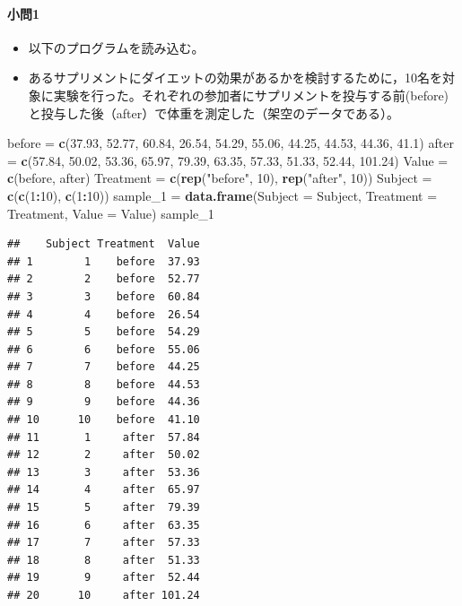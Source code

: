\documentclass[]{article}
\newenvironment{Shaded}{\begin{snugshade}}{\end{snugshade}}
\newcommand{\KeywordTok}[1]{\textcolor[rgb]{0.13,0.29,0.53}{\textbf{#1}}}
\newcommand{\DataTypeTok}[1]{\textcolor[rgb]{0.13,0.29,0.53}{#1}}
\newcommand{\DecValTok}[1]{\textcolor[rgb]{0.00,0.00,0.81}{#1}}
\newcommand{\FloatTok}[1]{\textcolor[rgb]{0.00,0.00,0.81}{#1}}
\newcommand{\StringTok}[1]{\textcolor[rgb]{0.31,0.60,0.02}{#1}}
\newcommand{\OperatorTok}[1]{\textcolor[rgb]{0.81,0.36,0.00}{\textbf{#1}}}
\newcommand{\NormalTok}[1]{#1}
\providecommand{\tightlist}{%
  \setlength{\itemsep}{0pt}\setlength{\parskip}{0pt}}
\let\oldparagraph\paragraph
\renewcommand{\paragraph}[1]{\oldparagraph{#1}\mbox{}}
\begin{document}
\paragraph{小問1}\label{1}

\begin{itemize}
\tightlist
\item
  以下のプログラムを読み込む。\\
\item
  あるサプリメントにダイエットの効果があるかを検討するために，10名を対象に実験を行った。それぞれの参加者にサプリメントを投与する前(before)と投与した後（after）で体重を測定した（架空のデータである）。
\end{itemize}

\begin{Shaded}
\begin{Highlighting}[]
\NormalTok{before =}\StringTok{ }\KeywordTok{c}\NormalTok{(}\FloatTok{37.93}\NormalTok{, }\FloatTok{52.77}\NormalTok{, }\FloatTok{60.84}\NormalTok{, }\FloatTok{26.54}\NormalTok{, }\FloatTok{54.29}\NormalTok{, }\FloatTok{55.06}\NormalTok{, }\FloatTok{44.25}\NormalTok{, }\FloatTok{44.53}\NormalTok{, }\FloatTok{44.36}\NormalTok{, }\FloatTok{41.1}\NormalTok{)}
\NormalTok{after =}\StringTok{ }\KeywordTok{c}\NormalTok{(}\FloatTok{57.84}\NormalTok{, }\FloatTok{50.02}\NormalTok{, }\FloatTok{53.36}\NormalTok{, }\FloatTok{65.97}\NormalTok{, }\FloatTok{79.39}\NormalTok{, }\FloatTok{63.35}\NormalTok{, }\FloatTok{57.33}\NormalTok{, }\FloatTok{51.33}\NormalTok{, }\FloatTok{52.44}\NormalTok{, }\FloatTok{101.24}\NormalTok{)}
\NormalTok{Value =}\StringTok{ }\KeywordTok{c}\NormalTok{(before, after)}
\NormalTok{Treatment =}\StringTok{ }\KeywordTok{c}\NormalTok{(}\KeywordTok{rep}\NormalTok{(}\StringTok{"before"}\NormalTok{, }\DecValTok{10}\NormalTok{), }\KeywordTok{rep}\NormalTok{(}\StringTok{"after"}\NormalTok{, }\DecValTok{10}\NormalTok{))}
\NormalTok{Subject =}\StringTok{ }\KeywordTok{c}\NormalTok{(}\KeywordTok{c}\NormalTok{(}\DecValTok{1}\OperatorTok{:}\DecValTok{10}\NormalTok{), }\KeywordTok{c}\NormalTok{(}\DecValTok{1}\OperatorTok{:}\DecValTok{10}\NormalTok{))}
\NormalTok{sample_}\DecValTok{1}\NormalTok{ =}\StringTok{ }\KeywordTok{data.frame}\NormalTok{(}\DataTypeTok{Subject =}\NormalTok{ Subject, }\DataTypeTok{Treatment =}\NormalTok{ Treatment, }\DataTypeTok{Value =}\NormalTok{ Value)}
\NormalTok{sample_}\DecValTok{1}
\end{Highlighting}
\end{Shaded}

\begin{verbatim}
##    Subject Treatment  Value
## 1        1    before  37.93
## 2        2    before  52.77
## 3        3    before  60.84
## 4        4    before  26.54
## 5        5    before  54.29
## 6        6    before  55.06
## 7        7    before  44.25
## 8        8    before  44.53
## 9        9    before  44.36
## 10      10    before  41.10
## 11       1     after  57.84
## 12       2     after  50.02
## 13       3     after  53.36
## 14       4     after  65.97
## 15       5     after  79.39
## 16       6     after  63.35
## 17       7     after  57.33
## 18       8     after  51.33
## 19       9     after  52.44
## 20      10     after 101.24
\end{verbatim}
\end{document}
